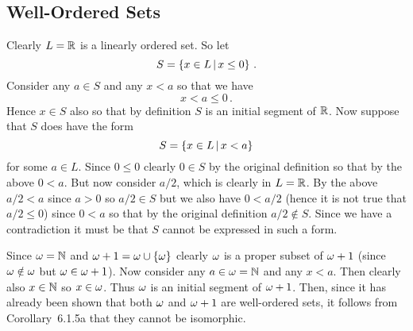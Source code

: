 \subsection{Well-Ordered Sets}

\begin{solution}
    Clearly $L = \mathbb{R}$ is a linearly ordered set.
    So let
    $$
    S = \left\{ x \in L \,|\, x \leq 0 \right\} \,.
    $$
    Consider any $a \in S$ and any $x < a$ so that we have
    $$
    x < a \leq 0 \,.
    $$
    Hence $x \in S$ also so that by definition $S$ is an initial segment of $\mathbb{R}$.
    Now suppose that $S$ does have the form
    $$
    S = \left\{ x \in L \,|\, x < a \right\}
    $$
    for some $a \in L$.
    Since $0 \leq 0$ clearly $0 \in S$ by the original definition so that by the above $0 < a$.
    But now consider $a/2$, which is clearly in $L = \mathbb{R}$.
    By the above $a/2 < a$ since $a > 0$ so $a/2 \in S$ but we also have $0 < a/2$ (hence it is not true that $a/2 \leq 0$) since $0 < a$ so that by the original definition $a/2 \notin S$.
    Since we have a contradiction it must be that $S$ cannot be expressed in such a form. \qedsymbol
\end{solution}


\begin{solution}
    Since $\omega = \mathbb{N}$ and $\omega + 1 = \omega \cup \left\{ \omega \right\}$ clearly $\omega$ is a proper subset of $\omega + 1$ (since $\omega \notin \omega$ but $\omega \in \omega + 1$).
    Now consider any $a \in \omega = \mathbb{N}$ and any $x < a$.
    Then clearly also $x \in \mathbb{N}$ so $x \in \omega$.
    Thus $\omega$ is an initial segment of $\omega + 1$.
    Then, since it has already been shown that both $\omega$ and $\omega + 1$ are well-ordered sets, it follows from Corollary~6.1.5a that they  cannot be isomorphic.
\end{solution}


